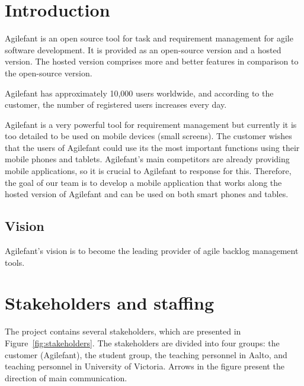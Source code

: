 \section{Introduction}
Agilefant is an open source tool for task and requirement management for agile 
software development. It is provided as an open-source version and a hosted 
version. The hosted version comprises more and better features in comparison to 
the open-source version.

Agilefant has approximately 10,000 users worldwide, and according to the 
customer, the number of registered users increases every day. 
 
Agilefant is a very powerful tool for requirement management but currently it 
is too detailed to be used on mobile devices (small screens). The customer 
wishes that the users of Agilefant could use its the most important functions 
using their mobile phones and tablets. Agilefant's main competitors are already 
providing mobile applications, so it is crucial to Agilefant to response for 
this. Therefore, the goal of our team is to develop a mobile application that 
works along the hosted version of Agilefant and can be used on both smart 
phones and tables.

\subsection{Vision}

Agilefant's vision is to become the leading provider of agile backlog management tools.

\section{Stakeholders and staffing}

The project contains several stakeholders, which are presented in Figure~\ref{fig:stakeholders}. The stakeholders are divided into four groups: the customer (Agilefant), the student group, the teaching personnel in Aalto, and teaching personnel in University of Victoria. Arrows in the figure present the direction of main communication.

